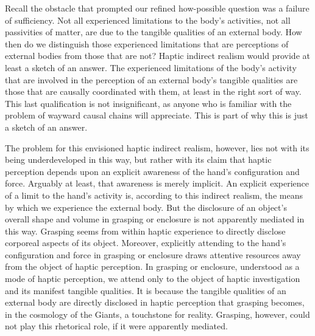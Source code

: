 
Recall the obstacle that prompted our refined how-possible question was a failure of sufficiency. Not all experienced limitations to the body's activities, not all passivities of matter, are due to the tangible qualities of an external body. How then do we distinguish those experienced limitations that are perceptions of external bodies from those that are not? Haptic indirect realism would provide at least a sketch of an answer. The experienced limitations of the body's activity that are involved in the perception of an external body's tangible qualities are those that are causally coordinated with them, at least in the right sort of way. This last qualification is not insignificant, as anyone who is familiar with the problem of wayward causal chains will appreciate. This is part of why this is just a sketch of an answer. 

The problem for this envisioned haptic indirect realism, however, lies not with its being underdeveloped in this way, but rather with its claim that haptic perception depends upon an explicit awareness of the hand's configuration and force. Arguably at least, that awareness is merely implicit. An explicit experience of a limit to the hand's activity is, according to this indirect realism, the means by which we experience the external body. But the disclosure of an object's overall shape and volume in grasping or enclosure is not apparently mediated in this way. Grasping seems from within haptic experience to directly disclose corporeal aspects of its object. Moreover, explicitly attending to the hand's configuration and force in grasping or enclosure draws attentive resources away from the object of haptic perception. In grasping or enclosure, understood as a mode of haptic perception, we attend only to the object of haptic investigation and its manifest tangible qualities. It is because the tangible qualities of an external body are directly disclosed in haptic perception that grasping becomes, in the cosmology of the Giants, a touchstone for reality. Grasping, however, could not play this rhetorical role, if it were apparently mediated.

